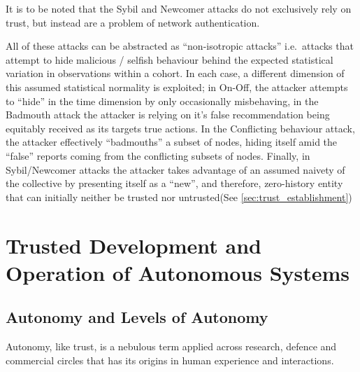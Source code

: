 It is to be noted that the Sybil and Newcomer attacks do not exclusively rely on trust, but instead are a problem of network authentication.

All of these attacks can be abstracted as ``non-isotropic attacks'' i.e.\ attacks that attempt to hide malicious / selfish behaviour behind the expected statistical variation in observations within a cohort.
In each case, a different dimension of this assumed statistical normality is exploited; in On-Off, the attacker attempts to ``hide'' in the time dimension by only occasionally misbehaving, in the Badmouth attack the attacker is relying on it's false recommendation being equitably received as its targets true actions. 
In the Conflicting behaviour attack, the attacker effectively ``badmouths'' a subset of nodes, hiding itself amid the ``false'' reports coming from the conflicting subsets of nodes. 
Finally, in Sybil/Newcomer attacks the attacker takes advantage of an assumed naivety of the collective by presenting itself as a ``new'', and therefore, zero-history entity that can initially neither be trusted nor untrusted(See \autoref{sec:trust_establishment})

\pagebreak
\section{Trusted Development and Operation of Autonomous Systems}\label{sec:trust_autonomy}

\subsection{Autonomy and Levels of Autonomy}

Autonomy, like trust, is a nebulous term applied across research, defence and commercial circles that has its origins in human experience and interactions. 

